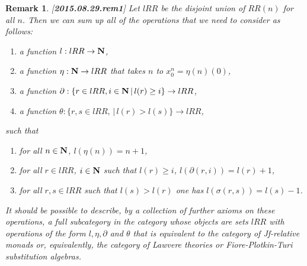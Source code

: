 \documentclass[11pt]{article}
\newtheorem{remark}[proposition]{Remark}
\newcommand{\llabel}[1]{\label{#1}[{\bf #1}]}
\newcommand{\sr}{\rightarrow}
\newcommand{\nn}{{\bf N\rm}}
\newcommand{\nat}{\nn}
\begin{document}
%
\begin{remark}\rm
\llabel{2015.08.29.rem1}
Let $lRR$ be the disjoint union of $RR(n)$ for all $n$. Then we can sum up all of the operations that we need to consider as follows: 
%
\begin{enumerate}
\item a function $l:lRR\sr\nat$,
\item a function $\eta:\nat\sr lRR$ that takes $n$ to $x^n_0=\eta(n)(0)$,
\item a function $\partial:\{r\in lRR, i\in\nat\,|\, l(r)\ge i\}\sr lRR$,
\item a function $\theta:\{r,s\in lRR,\,|\,l(r)>l(s)\}\sr lRR$,
\end{enumerate}
%
such that
%
\begin{enumerate}
\item for all $n\in\nat$, $l(\eta(n))=n+1$,
\item for all $r\in lRR$, $i\in\nat $ such that $l(r)\ge i$, $l(\partial(r,i))=l(r)+1$,
\item for all $r,s\in lRR$ such that $l(s)>l(r)$ one has $l(\sigma(r,s))=l(s)-1$.
\end{enumerate}
%
It should be possible to describe, by a collection of further axioms on these operations, a full subcategory in the category whose objects are sets $lRR$ with operations of the form $l,\eta,\partial$ and $\theta$ that is equivalent to the category of Jf-relative monads or, equivalently, the category of Lawvere theories or Fiore-Plotkin-Turi substitution algebras. 
\end{remark}
%
\end{document}
